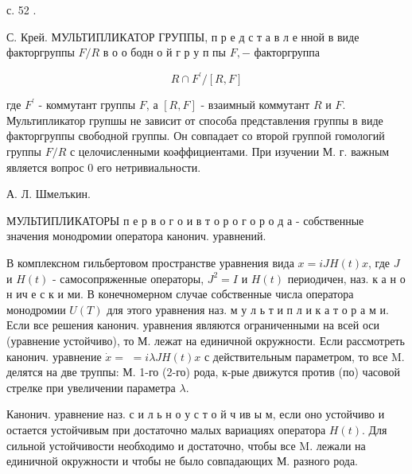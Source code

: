\documentclass[10pt]{article}
\begin{document}
с. 52 .

С. Крей. МУЛЬТИПЛИКАТОР ГРУППЫ, п р е д с т а в л е нной в виде факторгруппы $F / R$ в о о бодн о й $г$ р у п пы $F,-$ факторгруппа



\[

R \cap F^{\prime} /[R, F]

\]



где $F^{\prime}$ - коммутант группы $F$, а $[R, F]$ - взаимный коммутант $R$ и $F$. Мультипликатор групшы не зависит от способа представления группы в виде факторгруппы свободной группы. Он совпадает со второй группой гомологий группы $F / R$ с целочисленными коәффициентами. При изучении М. г. важным является вопрос 0 его нетривиальности.



А. Л. Шмелъкин.



МУЛЬТИПЛИКАТОРЫ п е р в о г о и в т о р о г о р о д а - собственные значения монодромии оператора канонич. уравнений.



В комплексном гильбертовом пространстве уравнения вида $x=i J H(t) x$, где $J$ и $H(t)$ - самосопряженные операторы, $J^{2}=I$ и $H(t)$ периодичен, наз. к а н о н ич е с к и ми. В конечномерном случае собственные числа оператора монодромии $U(T)$ для этого уравнения наз. м у л ь т и п л и к а т о р а м и. Если все решения канонич. уравнения являются ограниченными на всей оси (уравнение устойчиво), то М. лежат на единичной окружности. Если рассмотреть канонич. уравнение $\dot{x}=$ $=i \lambda J H(t) x$ с действительным параметром, то все $\mathrm{M}$. делятся на две труппы: М. 1-го (2-го) рода, к-рые движутся против (по) часовой стрелке при увеличении параметра $\lambda$.



Канонич. уравнение наз. с и л ь н о у с т о й ч ив ы м, если оно устойчиво и остается устойчивым при достаточно малых вариациях оператора $H(t)$. Для сильной устойчивости необходимо и достаточно, чтобы все $\mathrm{M}$. лежали на единичной окружности и чтобы не было совпадающих М. разного рода.
\end{document}
